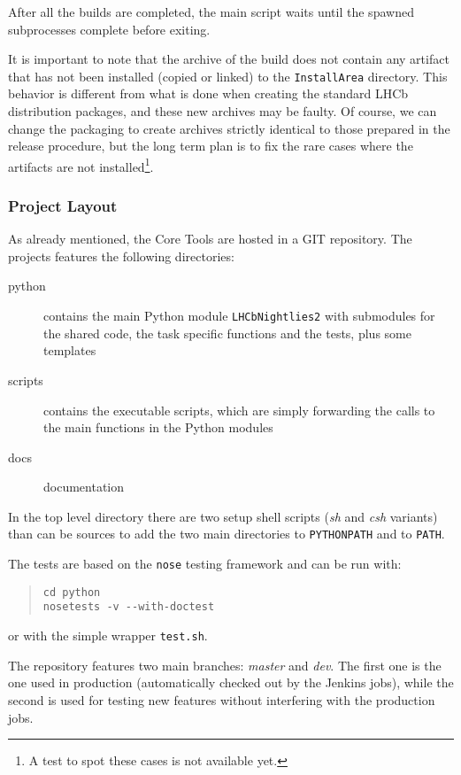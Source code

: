 After all the builds are completed, the main script waits until the spawned
subprocesses complete before exiting.

It is important to note that the archive of the build does not contain any
artifact that has not been installed (copied or linked) to the
\texttt{InstallArea} directory.  This behavior is different from what is done
when creating the standard LHCb distribution packages, and these new archives
may be faulty. Of course, we can change the packaging to create archives
strictly identical to those prepared in the release procedure, but the long term
plan is to fix the rare cases where the artifacts are not installed\footnote{A
test to spot these cases is not available yet.}.

\subsubsection{Project Layout}
As already mentioned, the Core Tools are hosted in a GIT repository.  The
projects features the following directories:
\begin{description}
  \item[python] contains the main Python module \texttt{LHCbNightlies2} with
submodules for the shared code, the task specific functions and the tests, plus
some templates
  \item[scripts] contains the executable scripts, which are simply forwarding
the calls to the main functions in the Python modules
  \item[docs] documentation
\end{description}
In the top level directory there are two setup shell scripts (\emph{sh} and
\emph{csh} variants) than can be sources to add the two main directories to
\texttt{PYTHONPATH} and to \texttt{PATH}.

The tests are based on the \texttt{nose} testing framework\cite{nose} and can be
run with:
\begin{quote}
\begin{verbatim}
cd python
nosetests -v --with-doctest
\end{verbatim}
\end{quote}
or with the simple wrapper \texttt{test.sh}.

The repository features two main branches: \emph{master} and \emph{dev}.  The
first one is the one used in production (automatically checked out by the
Jenkins jobs), while the second is used for testing new features without
interfering with the production jobs.

